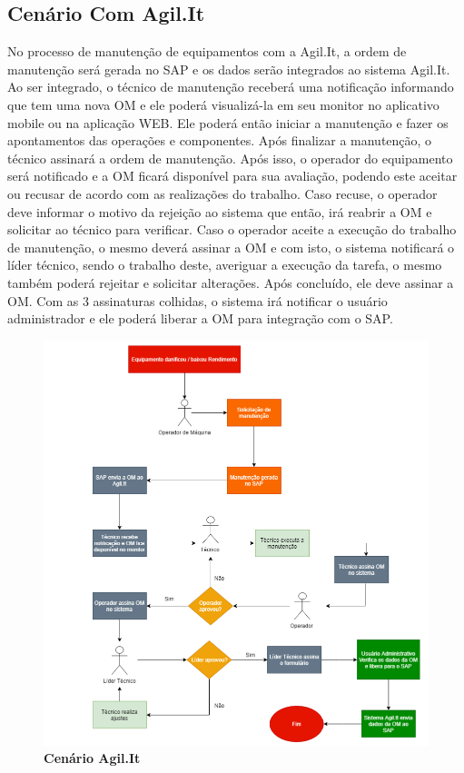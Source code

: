 \subsection{Cenário Com Agil.It}
No processo de manutenção de equipamentos com a Agil.It, a ordem de manutenção será gerada no SAP e os dados serão integrados ao sistema Agil.It. Ao ser integrado, o técnico de manutenção receberá uma notificação informando que tem uma nova OM e ele poderá visualizá-la em seu monitor no aplicativo mobile ou na aplicação WEB. Ele poderá então iniciar a manutenção e fazer os apontamentos das operações e componentes. Após finalizar a manutenção, o técnico assinará a ordem de manutenção. Após isso, o operador do equipamento será notificado e a OM ficará disponível para sua avaliação, podendo este aceitar ou recusar de acordo com as realizações do trabalho. Caso recuse, o operador deve informar o motivo da rejeição ao sistema que então, irá reabrir a OM e solicitar ao técnico para verificar. Caso o operador aceite a execução do trabalho de manutenção, o mesmo deverá assinar a OM e com isto, o sistema notificará o líder técnico, sendo o trabalho deste, averiguar a execução da tarefa, o mesmo também poderá rejeitar e solicitar alterações. Após concluído, ele deve assinar a OM. Com as 3 assinaturas colhidas, o sistema irá notificar o usuário administrador e ele poderá liberar a OM para integração com o SAP.

\begin{figure}[htb]
	\caption{\textbf{\label{figure:cenario_agilit1}Cenário Agil.It}}
	\begin{center}
		\includegraphics[scale=0.52]{./Figuras/cenario-agilit1.png}
	\end{center}
\end{figure}
